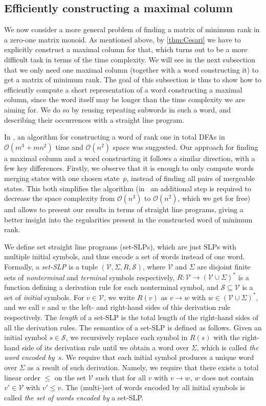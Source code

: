 \documentclass[11pt,a4paper]{amsart}
\newcommand{\OO}{\mathcal{O}}
\newcommand{\VV}{\mathcal{V}}
\newcommand{\Start}{\mathcal{S}}
\theoremstyle{plain}
\theoremstyle{definition}
\theoremstyle{defC}
\theoremstyle{thmC}
\theoremstyle{plain}
\numberwithin{equation}{section}
\begin{document}
\subsection{Efficiently constructing a maximal column}\label{subsec:max-col} 

We now consider a more general problem of finding a matrix of minimum rank in a zero-one matrix monoid. As mentioned above, by \autoref{thm:Cesari} we have to explicitly construct a maximal column for that, which turns out to be a more difficult task in terms of the time complexity. We will see in the next subsection that we only need one maximal column (together with a word constructing it) to get a matrix of minimum rank.
The goal of this subsection is thus to show how to efficiently compute a short representation of a word constructing a maximal column, since the word itself may be longer than the time complexity we are aiming for. We do so by reusing repeating subwords in such a word, and describing their occurrences with a straight line program.

In \cite[Section 5]{Eppstein1990}, an algorithm for constructing a word of rank one in total DFAs in $\OO(m^3 + mn^2)$ time and $\OO(n^2)$ space was suggested. Our approach for finding a maximal column and a word constructing it follows a similar direction, with a few key differences. Firstly, we observe that it is enough to only compute words merging states with one chosen state~$p$, instead of finding all pairs of mergeable states. This both simplifies the algorithm (in~\cite{Eppstein1990} an additional step is required to decrease the space complexity from $\OO(n^3)$ to $\OO(n^2)$, which we get for free) and allows to present our results in terms of straight line programs, giving a better insight into the regularities present in the constructed word of minimum rank.

We define set straight line programs (set-SLPs), which are just SLPs with multiple initial symbols, and thus encode a set of words instead of one word.
Formally, a \emph{set-SLP} is a tuple $(\VV, \Sigma, R, \Start)$, where $\VV$ and $\Sigma$ are disjoint finite sets of \emph{nonterminal} and \emph{terminal} symbols respectively, $R \colon \VV \to (\VV \cup \Sigma)^*$ is a function defining a derivation rule for each nonterminal symbol, and $\Start \subseteq \VV$ is a set of \emph{initial} symbols. For $v \in \VV$, we write $R(v)$ as $v \to w$ with $w \in (\VV \cup \Sigma)^*$, and we call $v$ and $w$ the left- and right-hand sides of this derivation rule respectively. The \emph{length} of a set-SLP is the total length of the right-hand sides of all the derivation rules.
The semantics of a set-SLP is defined as follows. Given an initial symbol $s \in \Start$, we recursively replace each symbol in $R(s)$ with the right-hand side of its derivation rule until we obtain a word over $\Sigma$, which is called \emph{the word encoded by~$s$}.
We require that each initial symbol produces a unique word over $\Sigma$ as a result of such derivation. Namely, we require that there exists a total linear order $\le$ on the set $\VV$ such that for all $v$ with $v \to w$, $w$ does not contain $v' \in \VV$ with $v' \le v$. The (multi-)set of words encoded by all initial symbols is called \emph{the set of words encoded by} a set-SLP.
\end{document}

